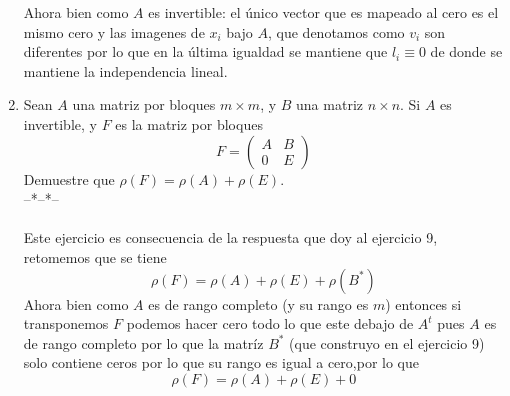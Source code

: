 \documentclass[letter]{memoir} %
\begin{document}
\begin{enumerate}
Ahora bien como $A$ es invertible: el único vector que es mapeado al cero es el mismo cero y las imagenes de $x_i$ bajo $A$, que denotamos como $v_i$ son diferentes por lo que en la última igualdad se mantiene que $l_i \equiv 0$ de donde se mantiene la independencia lineal.

\item Sean $A$ una matriz por bloques $m\times m$, y $B$ una matriz $n\times n$. Si $A$ es invertible, y $F$ es la matriz por bloques \[
			F= \left( 
            \begin{array}{cc }
            A & B \\
            0 & E
          	\end{array}
					\right)
		\]
Demuestre que $\rho(F) = \rho(A) +\rho(E)$.\\
--*--*--\\\\
Este ejercicio es consecuencia de la respuesta que doy al ejercicio 9, retomemos que se tiene 
\begin{equation*} 
\rho(F) = \rho(A) + \rho(E) +\rho(B^*)
\end{equation*}
Ahora bien como $A$ es de rango completo (y su rango es $m$) entonces si transponemos $F$ podemos hacer cero todo lo que este debajo de $A^t$ pues $A$ es de rango completo por lo que la matríz $B^*$ (que construyo en el ejercicio 9) solo contiene ceros por lo que su rango es igual a cero,por lo que 
\begin{equation*} 
\rho(F) = \rho(A) + \rho(E) + 0
\end{equation*}
\end{enumerate}
 
\end{document}
